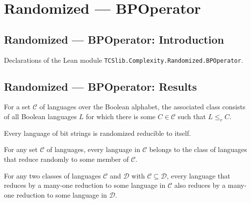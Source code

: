 \section{Randomized --- BPOperator}
\subsection*{Randomized --- BPOperator: Introduction}

Declarations of the Lean module \texttt{TCSlib.Complexity.Randomized.BPOperator}.

\subsection*{Randomized --- BPOperator: Results}

\begin{definition}
\label{Randomized.BPdot}
\leanok
For a set $\mathcal{C}$ of languages over the Boolean alphabet, the associated class
consists of all Boolean languages $L$ for which there is some $C\in\mathcal{C}$ such
that $L\leq_r C$.
\end{definition}

\begin{theorem}
\label{Randomized.RandReducible.refl}
\leanok
{}
Every language of bit strings is randomized reducible to itself.
\end{theorem}

\begin{theorem}
\label{Randomized.subset_BPdot}
\leanok
{}
For any set $\mathcal{C}$ of languages, every language in $\mathcal{C}$ belongs to the
class of languages that reduce randomly to some member of $\mathcal{C}$.
\end{theorem}

\begin{theorem}
\label{Randomized.BPdot_mono}
\leanok
{}
For any two classes of languages $\mathcal{C}$ and $\mathcal{D}$ with $\mathcal{C}
\subseteq \mathcal{D}$, every language that reduces by a many-one reduction to some
language in $\mathcal{C}$ also reduces by a many-one reduction to some language in
$\mathcal{D}$.
\end{theorem}

